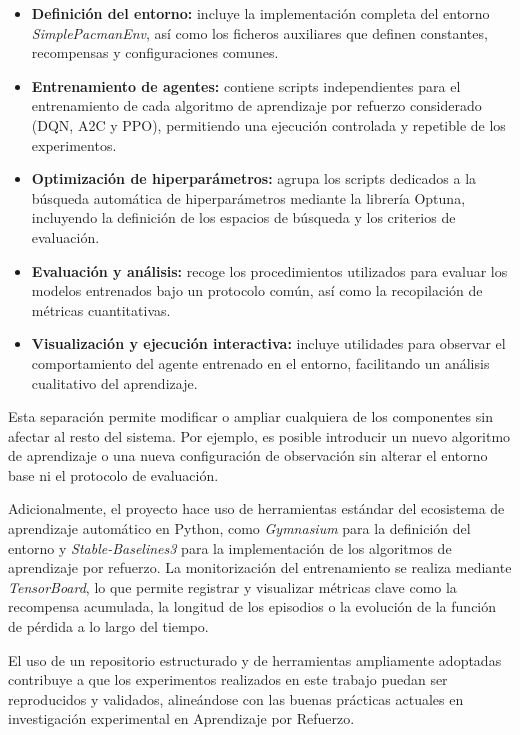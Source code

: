 \begin{itemize}
    \item \textbf{Definición del entorno:} incluye la implementación completa del entorno \textit{SimplePacmanEnv}, así como los ficheros auxiliares que definen constantes, recompensas y configuraciones comunes.
    \item \textbf{Entrenamiento de agentes:} contiene scripts independientes para el entrenamiento de cada algoritmo de aprendizaje por refuerzo considerado (DQN, A2C y PPO), permitiendo una ejecución controlada y repetible de los experimentos.
    \item \textbf{Optimización de hiperparámetros:} agrupa los scripts dedicados a la búsqueda automática de hiperparámetros mediante la librería Optuna, incluyendo la definición de los espacios de búsqueda y los criterios de evaluación.
    \item \textbf{Evaluación y análisis:} recoge los procedimientos utilizados para evaluar los modelos entrenados bajo un protocolo común, así como la recopilación de métricas cuantitativas.
    \item \textbf{Visualización y ejecución interactiva:} incluye utilidades para observar el comportamiento del agente entrenado en el entorno, facilitando un análisis cualitativo del aprendizaje.
\end{itemize}

Esta separación permite modificar o ampliar cualquiera de los componentes sin afectar al resto del sistema. Por ejemplo, es posible introducir un nuevo algoritmo de aprendizaje o una nueva configuración de observación sin alterar el entorno base ni el protocolo de evaluación.

Adicionalmente, el proyecto hace uso de herramientas estándar del ecosistema de aprendizaje automático en Python, como \textit{Gymnasium} para la definición del entorno y \textit{Stable-Baselines3} para la implementación de los algoritmos de aprendizaje por refuerzo. La monitorización del entrenamiento se realiza mediante \textit{TensorBoard}, lo que permite registrar y visualizar métricas clave como la recompensa acumulada, la longitud de los episodios o la evolución de la función de pérdida a lo largo del tiempo.

El uso de un repositorio estructurado y de herramientas ampliamente adoptadas contribuye a que los experimentos realizados en este trabajo puedan ser reproducidos y validados, alineándose con las buenas prácticas actuales en investigación experimental en Aprendizaje por Refuerzo.

